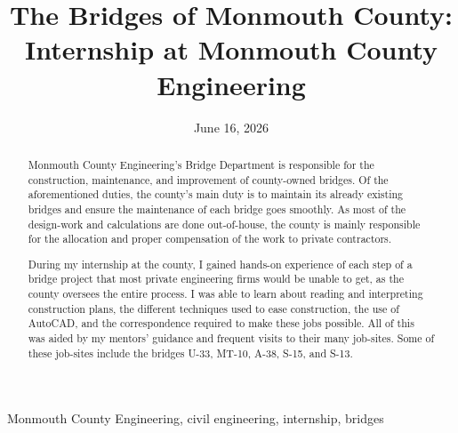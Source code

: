 \documentclass[12pt,conference,onecolumn]{IEEEtran}
\title{The Bridges of Monmouth County: Internship at Monmouth County Engineering}
\author{%
\IEEEauthorblockN{Ryan Leung}\IEEEauthorblockA{Science \& Engineering\\Manalapan High School\\Englishtown, NJ\\\href{mailto:426rleung@frhsd.com}{426rleung@frhsd.com}}}
\date{June 16, 2026}
\newcommand{\keywords}{Monmouth County Engineering, civil engineering, internship, bridges}
\begin{document}
\maketitle 

\begin{abstract}
Monmouth County Engineering’s Bridge Department is responsible for the construction, maintenance, and improvement of county-owned bridges. Of the aforementioned duties, the county’s main duty is to maintain its already existing bridges and ensure the maintenance of each bridge goes smoothly. As most of the design-work and calculations are done out-of-house, the county is mainly responsible for the allocation and proper compensation of the work to private contractors.

During my internship at the county, I gained hands-on experience of each step of a bridge project that most private engineering firms would be unable to get, as the county oversees the entire process. I was able to learn about reading and interpreting construction plans, the different techniques used to ease construction, the use of AutoCAD, and the correspondence required to make these jobs possible. All of this was aided by my mentors’ guidance and frequent visits to their many job-sites. Some of these job-sites include the bridges U-33, MT-10, A-38, S-15, and S-13.
\end{abstract}

\begin{IEEEkeywords}
\keywords
\end{IEEEkeywords}
\end{document}
